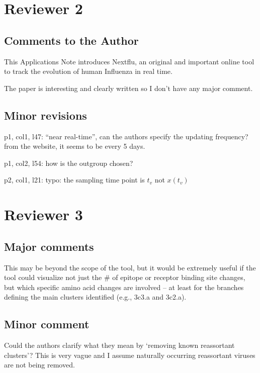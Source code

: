 \documentclass[11pt,oneside,letterpaper]{article}
\begin{document}
\section*{Reviewer 2}

\subsection*{Comments to the Author}

This Applications Note introduces Nextflu, an original and important online tool to track the evolution of human Influenza in real time.

The paper is interesting and clearly written so I don't have any major comment.

\subsection*{Minor revisions}

p1, col1, l47: ``near real-time'', can the authors specify the updating frequency? from the website, it seems to be every 5 days.

p1, col2, l54: how is the outgroup chosen?

p2, col1, l21: typo: the sampling time point is $t_v$ not $x(t_v)$

\section*{Reviewer 3}

\subsection*{Major comments}

This may be beyond the scope of the tool, but it would be extremely useful if the tool could visualize not just the \# of epitope or receptor binding site changes, but which specific amino acid changes are involved -- at least for the branches defining the main clusters identified (e.g., 3c3.a and 3c2.a).

\subsection*{Minor comment}

Could the authors clarify what they mean by `removing known reassortant clusters'?  This is very vague and I assume naturally occurring reassortant viruses are not being removed.
\end{document}
